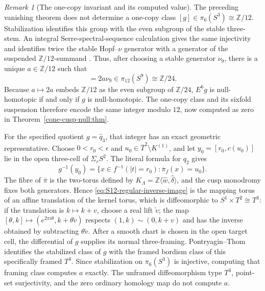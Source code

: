 \documentclass[11pt,letterpaper]{article}
\numberwithin{equation}{section}
\theoremstyle{definition}
\theoremstyle{remark}
\newtheorem{remark}[theorem]{Remark}
\newcommand{\Z}{\mathbb Z}
\begin{document}
\begin{remark}[The one-copy invariant and its computed value]
\label{rem:S12-one-copy-invariant}
The preceding vanishing theorem does not determine a one-copy class
\([g]\in\pi_6(S^3)\cong\Z/12\).  Stabilization identifies this group with
the even subgroup of the stable three-stem.  An integral
Serre-spectral-sequence calculation gives the same injectivity and identifies
twice the stable Hopf--\(\nu\) generator with a generator of the suspended
\(\Z/12\)-summand
\citep[Theorem~5.41(b), p.~573, and pp.~577--578]
{HatcherSpectralSequences}.  Thus, after choosing a stable generator
\(\nu_9\), there is a unique \(a\in\Z/12\) such that
\begin{equation}
 [E^6g]=2a\nu_9\in\pi_{12}(S^9)\cong\Z/24.
 \label{eq:S12-sixfold-suspension-class}
\end{equation}
Because \(a\mapsto2a\) embeds \(\Z/12\) as the even subgroup of
\(\Z/24\), \(E^6g\) is null-homotopic if and only if \(g\) is
null-homotopic.  The one-copy class and its sixfold suspension therefore
encode the same integer modulo \(12\), now computed as zero in
Theorem~\ref{cone-cusp-null:thm}.

For the specified quotient \(g=\widehat q_3\), that integer has an exact
geometric representative.  Choose \(0<r_0<\epsilon\) and
\(u_0\in\overline T^2\setminus K^{(1)}\), and let
\(y_0=[r_0,c(u_0)]\) lie in the open three-cell of \(\Sigma_rS^2\).  The
literal formula for \(q_2\) gives
\begin{equation}
 g^{-1}(y_0)
 =\{x\in f^{-1}(|t|=r_0):\overline\pi_f(x)=u_0\}.
 \label{eq:S12-regular-inverse-image}
\end{equation}
The fibre of \(\overline\pi\) is the two-torus defined by
\(K_\Lambda=\Z\langle\widehat w,\widehat\delta\rangle\), and the cusp
monodromy fixes both generators.  Hence
\cref{eq:S12-regular-inverse-image} is the mapping torus of an affine translation of the kernel torus,
which is diffeomorphic to \(S^1\times T^2\cong T^3\): if the translation is
\(k\mapsto k+v\), choose a real lift \(\widetilde v\); the map
\([\theta,k]\mapsto(e^{2\pi i\theta},k+\theta\widetilde v)\) respects
\((1,k)\sim(0,k+v)\) and has the inverse obtained by subtracting
\(\theta\widetilde v\). After a smooth chart is chosen in the open
target cell, the differential of \(g\) supplies its normal three-framing.
Pontryagin--Thom identifies the stabilized class of \(g\) with the framed
bordism class of this specifically framed \(T^3\).  Since stabilization on
\(\pi_6(S^3)\) is injective, computing that framing class computes \(a\)
exactly.  The unframed diffeomorphism type \(T^3\), point-set surjectivity,
and the zero ordinary homology map do not compute \(a\).
\end{remark}
\end{document}
